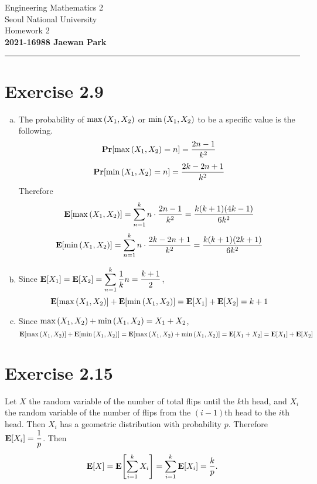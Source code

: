 \documentclass{article}
\begin{document}
\vspace*{-1.5cm}
{\centering \vbox{%
\vspace{2mm}
\large
Engineering Mathematics 2 \hfill
\\
Seoul National University
\\[4mm]
Homework 2\\
\textbf{2021-16988 Jaewan Park} \\[0.8mm]
}}
\par\noindent\rule{\textwidth}{0.5pt}

\section*{Exercise 2.9}
\begin{enumerate}[(a)]
  \item The probability of $\max\qty(X_1, X_2)$ or $\min\qty(X_1, X_2)$ to be a specific value is the following.
  $$\mathbf{Pr}\qty[\max\qty(X_1, X_2) = n] = \frac{2n-1}{k^2}$$
  $$\mathbf{Pr}\qty[\min\qty(X_1, X_2) = n] = \frac{2k-2n+1}{k^2}$$
  Therefore
  $$\mathbf{E}\qty[\max\qty(X_1, X_2)] = \sum_{n=1}^{k}n\cdot\frac{2n-1}{k^2} = \frac{k(k+1)(4k-1)}{6k^2}$$
  $$\mathbf{E}\qty[\min\qty(X_1, X_2)] = \sum_{n=1}^{k}n\cdot\frac{2k-2n+1}{k^2} = \frac{k(k+1)(2k+1)}{6k^2}$$
  \item Since $\displaystyle \mathbf{E}\qty[X_1] = \mathbf{E}\qty[X_2] = \sum_{n=1}^{k}\dfrac{1}{k}n = \dfrac{k+1}{2}$,
  $$\mathbf{E}\qty[\max\qty(X_1, X_2)] + \mathbf{E}\qty[\min\qty(X_1, X_2)] = \mathbf{E}\qty[X_1] + \mathbf{E}\qty[X_2] = k+1$$
  \item Since $\max\qty(X_1, X_2) + \min\qty(X_1, X_2) = X_1 + X_2$, 
  $$\mathbf{E}\qty[\max\qty(X_1, X_2)] + \mathbf{E}\qty[\min\qty(X_1, X_2)] = \mathbf{E}\qty[\max\qty(X_1, X_2) + \min\qty(X_1, X_2)] = \mathbf{E}\qty[X_1 + X_2] = \mathbf{E}\qty[X_1] + \mathbf{E}\qty[X_2]$$
\end{enumerate}

\section*{Exercise 2.15}
Let $X$ the random variable of the number of total flips until the $k$th head, and $X_i$ the random variable of the number of flips from the $(i-1)$th head to the $i$th head. 
Then $X_i$ has a geometric distribution with probability $p$. Therefore $\mathbf{E}\qty[X_i] = \dfrac{1}{p}$.
Then
$$\mathbf{E}\qty[X] = \mathbf{E}\qty[\sum_{i=1}^{k}X_i] = \sum_{i=1}^{k}\mathbf{E}\qty[X_i] = \frac{k}{p}.$$
\end{document}
